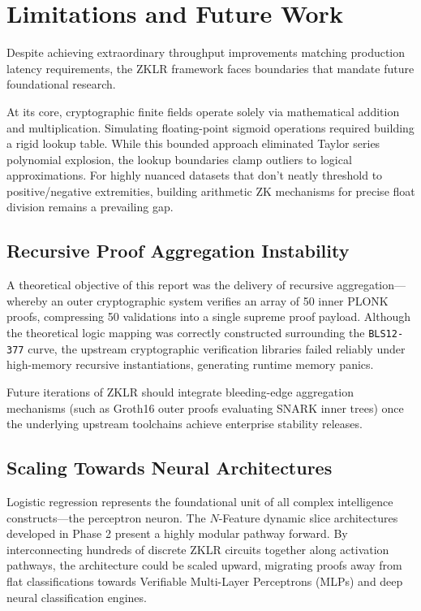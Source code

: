 \chapter{Limitations and Future Work}

Despite achieving extraordinary throughput improvements matching production latency requirements, the ZKLR framework faces boundaries that mandate future foundational research.

At its core, cryptographic finite fields operate solely via mathematical addition and multiplication. Simulating floating-point sigmoid operations required building a rigid lookup table. While this bounded approach eliminated Taylor series polynomial explosion, the lookup boundaries clamp outliers to logical approximations. For highly nuanced datasets that don't neatly threshold to positive/negative extremities, building arithmetic ZK mechanisms for precise float division remains a prevailing gap.

\section{Recursive Proof Aggregation Instability}
A theoretical objective of this report was the delivery of recursive aggregation---whereby an outer cryptographic system verifies an array of 50 inner PLONK proofs, compressing 50 validations into a single supreme proof payload. Although the theoretical logic mapping was correctly constructed surrounding the \texttt{BLS12-377} curve, the upstream cryptographic verification libraries failed reliably under high-memory recursive instantiations, generating runtime memory panics. 

Future iterations of ZKLR should integrate bleeding-edge aggregation mechanisms (such as Groth16 outer proofs evaluating SNARK inner trees) once the underlying upstream toolchains achieve enterprise stability releases.

\section{Scaling Towards Neural Architectures}
Logistic regression represents the foundational unit of all complex intelligence constructs---the perceptron neuron. The $N$-Feature dynamic slice architectures developed in Phase 2 present a highly modular pathway forward. By interconnecting hundreds of discrete ZKLR circuits together along activation pathways, the architecture could be scaled upward, migrating proofs away from flat classifications towards Verifiable Multi-Layer Perceptrons (MLPs) and deep neural classification engines.
